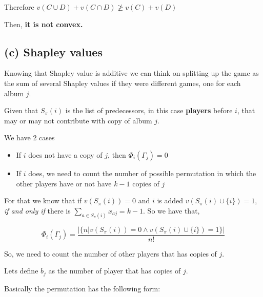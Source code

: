 \documentclass[12pt, a4paper]{article}
\begin{document}
Therefore $v(C \cup D) + v(C \cap D) \ngeq v(C) + v(D)$

Then, \textbf{it is not convex.}

\subsection{(c) Shapley values}
Knowing that Shapley value is additive we can think on splitting up the game as the sum of several
Shapley values if they were different games, one for each album $j$.

Given that $S_{\pi}(i)$ is the list of predecessors, in this case \textbf{players} before $i$, that may or may not contribute with copy of album $j$.

We have 2 cases 
\begin{itemize}
  \item If $i$ does not have a copy of $j$, then $\Phi_i(\Gamma_j) = 0$
  \item If $i$ does, we need to count the number of possible permutation in which the other players have or not have $k-1$ copies of $j$
\end{itemize}

For that we know that if $v(S_{\pi}(i)) = 0$ and $i$ is added $v(S_{\pi}(i) \cup \{i\}) = 1$, \textit{if and only if} there is
$\sum_{a \in S_{\pi}(i)} x_{aj} = k - 1$. So we have that,

\begin{equation}
  \Phi_i(\Gamma_j) = \frac{|\{n | v(S_{\pi}(i)) = 0 \land v(S_{\pi}(i) \cup \{i\}) = 1\}|}{n!}
\end{equation}

So, we need to count the number of other players that has copies of $j$.

Lets define $b_j$ as the number of player that has copies of $j$.

Basically the permutation has the following form:

\begin{center}
\end{center}
\end{document}
